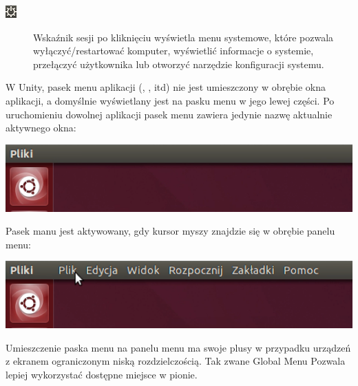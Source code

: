\begin{description}
\item[\includegraphics{images/unity_wskaznik_system.png}]\textcolor{ubuntu_orange}{Wskaźnik sesji} po kliknięciu wyświetla menu systemowe, które pozwala wyłączyć/restartować komputer, wyświetlić informacje o systemie, przełączyć użytkownika lub otworzyć narzędzie konfiguracji systemu.
\end{description}

\label{unity_menu_bar}
W Unity, pasek menu aplikacji (, ,  itd) nie jest umieszczony w obrębie okna aplikacji, a domyślnie wyświetlany jest na pasku menu w jego lewej części. Po uruchomieniu dowolnej aplikacji pasek menu zawiera jedynie nazwę aktualnie aktywnego okna:

\begin{center}
	\includegraphics[width=\linewidth]{images/unity_menu_bar2.png}
\end{center}

Pasek manu jest aktywowany, gdy kursor myszy znajdzie się w obrębie panelu menu:

\begin{center}
	\includegraphics[width=\linewidth]{images/unity_menu_bar3.png}
\end{center}

Umieszczenie paska menu na panelu menu ma swoje plusy w przypadku urządzeń z ekranem ograniczonym niską rozdzielczością. Tak zwane \textcolor{ubuntu_orange}{Global Menu} Pozwala lepiej wykorzystać dostępne miejsce w pionie.